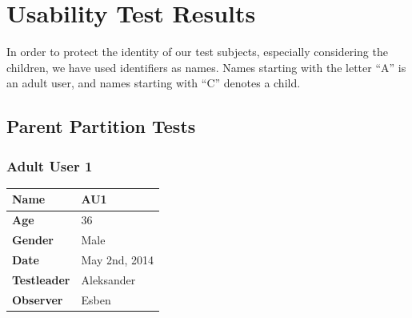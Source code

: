 \section{Usability Test Results}
\label{sec:usabilityresults}
In order to protect the identity of our test subjects, especially considering the children, we have used identifiers as names. Names starting with the letter ``A'' is an adult user, and names starting with ``C'' denotes a child.

\subsection{Parent Partition Tests}

\subsubsection{Adult User 1}
\begin{table}[H]
\centering
\begin{tabular}{|p{4.0cm} | p{4.0cm} |}
	\hline
	\textbf{Name} & AU1\\
	\hline
	\textbf{Age} & 36 \\
	\hline
	\textbf{Gender} & Male \\
 	\hline 
	\textbf{Date} & May 2nd, 2014 \\
	\hline
	\textbf{Testleader} & Aleksander\\
	\hline
	\textbf{Observer} & Esben\\
	\hline	
\end{tabular}
\end{table}

